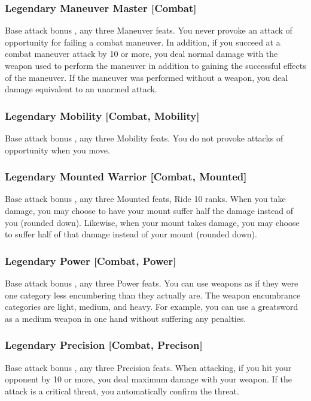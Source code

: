 \subsubsection{Legendary Maneuver Master [Combat]}
\featpre Base attack bonus , any three Maneuver feats.
\featben You never provoke an attack of opportunity for failing a combat maneuver. In addition, if you succeed at a combat maneuver attack by 10 or more, you deal normal damage with the weapon used to perform the maneuver in addition to gaining the successful effects of the maneuver. If the maneuver was performed without a weapon, you deal damage equivalent to an unarmed attack.

\subsubsection{Legendary Mobility [Combat, Mobility]}
\featpre Base attack bonus , any three Mobility feats.
\featben You do not provoke attacks of opportunity when you move.

\subsubsection{Legendary Mounted Warrior [Combat, Mounted]}
\featpre Base attack bonus , any three Mounted feats, Ride 10 ranks.
\featben When you take damage, you may choose to have your mount suffer half the damage instead of you (rounded down). Likewise, when your mount takes damage, you may choose to suffer half of that damage instead of your mount (rounded down).

\subsubsection{Legendary Power [Combat, Power]}
\featpres Base attack bonus , any three Power feats.
\featben You can use weapons as if they were one category less encumbering than they actually are. The weapon encumbrance categories are light, medium, and heavy. For example, you can use a greatsword as a medium weapon in one hand without suffering any penalties.

\subsubsection{Legendary Precision [Combat, Precison]}
\featpre Base attack bonus , any three Precision feats.
\featben When attacking, if you hit your opponent by 10 or more, you deal maximum damage with your weapon. If the attack is a critical threat, you automatically confirm the threat.


